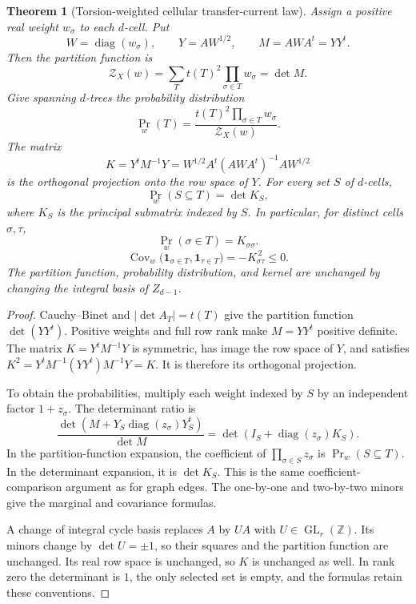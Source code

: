 \documentclass[11pt]{article}
\newtheorem{theorem}{Theorem}[section]
\theoremstyle{definition}
\theoremstyle{remark}
\newcommand{\Z}{\mathbb Z}
\begin{document}
\begin{theorem}[Torsion-weighted cellular transfer-current law]
\label{hte-general-theorem}
Assign a positive real weight $w_\sigma$ to each $d$-cell. Put
\[
W=\operatorname{diag}(w_\sigma),\qquad
Y=AW^{1/2},\qquad M=AWA^t=YY^t.
\]
Then the partition function is
\begin{equation}
\label{hte-partition}
\mathcal Z_X(w)
=\sum_{T}t(T)^2\prod_{\sigma\in T}w_\sigma
=\det M.
\end{equation}
Give spanning $d$-trees the probability distribution
\[
\Pr_w(T)=\frac{t(T)^2\prod_{\sigma\in T}w_\sigma}{\mathcal Z_X(w)}.
\]
The matrix
\begin{equation}
\label{hte-kernel}
K=Y^tM^{-1}Y
=W^{1/2}A^t(AWA^t)^{-1}AW^{1/2}
\end{equation}
is the orthogonal projection onto the row space of $Y$. For every set $S$
of $d$-cells,
\begin{equation}
\label{hte-joint-law}
\Pr_w(S\subseteq T)=\det K_S,
\end{equation}
where $K_S$ is the principal submatrix indexed by $S$. In particular, for
distinct cells $\sigma,\tau$,
\begin{equation}\label{hte-marginal}
\Pr_w(\sigma\in T)=K_{\sigma\sigma}.
\end{equation}
\begin{equation}\label{hte-covariance}
\operatorname{Cov}_w\bigl(\mathbf1_{\sigma\in T},\mathbf1_{\tau\in T}\bigr)
=-K_{\sigma\tau}^{\,2}\leq0.
\end{equation}
The partition function, probability distribution, and kernel are unchanged
by changing the integral basis of $Z_{d-1}$.
\end{theorem}

\begin{proof}
Cauchy--Binet and $|\det A_T|=t(T)$ give the partition function
$\det(YY^t)$. Positive weights and full row rank make $M=YY^t$ positive definite.
The matrix $K=Y^tM^{-1}Y$ is symmetric, has image the row space of $Y$, and satisfies
$K^2=Y^tM^{-1}(YY^t)M^{-1}Y=K$. It is therefore its orthogonal projection.

To obtain the probabilities, multiply each weight indexed by $S$ by an independent factor $1+z_\sigma$. The determinant ratio is
\[
 \frac{\det(M+Y_S\operatorname{diag}(z_\sigma)Y_S^t)}{\det M}
 =\det(I_S+\operatorname{diag}(z_\sigma)K_S).
\]
In the partition-function expansion, the coefficient of
$\prod_{\sigma\in S}z_\sigma$ is $\Pr_w(S\subseteq T)$.
In the determinant expansion, it is $\det K_S$.
This is the same coefficient-comparison argument as for graph edges.
The one-by-one and two-by-two minors give the marginal and covariance formulas.

A change of integral cycle basis replaces $A$ by $UA$ with
$U\in\operatorname{GL}_r(\Z)$. Its minors change by $\det U=\pm1$,
so their squares and the partition function are unchanged. Its real row
space is unchanged, so $K$ is unchanged as well. In rank zero the determinant
is $1$, the only selected set is empty, and the formulas retain these conventions.
\end{proof}
\end{document}
